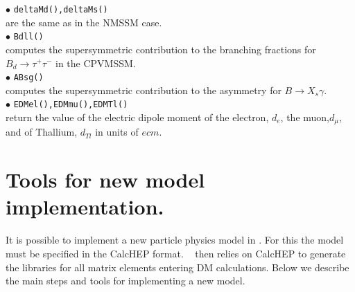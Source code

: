 \documentclass[12pt,a4paper]{article}
\begin{document}
\noindent$\bullet$ \verb|deltaMd(),deltaMs()|\\
are the same as in the NMSSM case.\\ 

\noi$\bullet$ \verb|Bdll()|\\
computes the supersymmetric contribution to the branching fractions for
${B}_d\rightarrow\tau^+\tau^-$ in the CPVMSSM.\\ 

\noi$\bullet$ \verb|ABsg()|\\
computes the supersymmetric contribution to the asymmetry for  ${B}\rightarrow X_s\gamma$.\\ 


\noindent$\bullet$ \verb|EDMel(),EDMmu(),EDMTl()|\\
return the  value of the
electric dipole moment of the electron, $d_e$, the muon,$d_\mu$,   
and of Thallium, $d_{Tl}$ in units of $ecm$. 


\section{Tools for new model implementation.}


It is possible to  implement a new particle physics  model  in \micro.
For this the model must be specified in the
CalcHEP format. \micro~ then relies on CalcHEP 
to generate the libraries for all matrix elements entering DM calculations. 
Below we describe the main steps and tools for implementing a new model.
\end{document}

